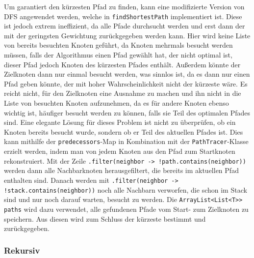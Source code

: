                 Um garantiert den kürzesten Pfad zu finden, kann eine modifizierte Version von DFS angewendet werden, welche in \lstinline{findShortestPath} implementiert ist. Diese ist jedoch extrem ineffizient, da alle Pfade durchsucht werden und erst dann der mit der geringsten Gewichtung zurückgegeben werden kann. Hier wird keine Liste von bereits besuchten Knoten geführt, da Knoten mehrmals besucht werden müssen, falls der Algorithmus einen Pfad gewählt hat, der nicht optimal ist, dieser Pfad jedoch Knoten des kürzesten Pfades enthält. Außerdem könnte der Zielknoten dann nur einmal besucht werden, was sinnlos ist, da es dann nur einen Pfad geben könnte, der mit hoher Wahrscheinlichkeit nicht der kürzeste wäre. Es reicht nicht, für den Zielknoten eine Ausnahme zu machen und ihn nicht in die Liste von besuchten Knoten aufzunehmen, da es für andere Knoten ebenso wichtig ist, häufiger besucht werden zu können, falls sie Teil des optimalen Pfades sind. Eine elegante Lösung für dieses Problem ist nicht zu überprüfen, ob ein Knoten bereits besucht wurde, sondern ob er Teil des aktuellen Pfades ist. Dies kann mithilfe der \lstinline{predecessors}-Map in Kombination mit der \lstinline{PathTracer}-Klasse erzielt werden, indem man von jedem Knoten aus den Pfad zum Startknoten rekonstruiert. Mit der Zeile \lstinline{.filter(neighbor -> !path.contains(neighbor))} werden dann alle Nachbarknoten herausgefiltert, die bereits im aktuellen Pfad enthalten sind. Danach werden mit \lstinline{.filter(neighbor -> !stack.contains(neighbor))} noch alle Nachbarn verworfen, die schon im Stack sind und nur noch darauf warten, besucht zu werden. Die \lstinline{ArrayList<List<T>> paths} wird dazu verwendet, alle gefundenen Pfade vom Start- zum Zielknoten zu speichern. Aus diesen wird zum Schluss der kürzeste bestimmt und zurückgegeben.
                
                

            \subsubsection{Rekursiv}

